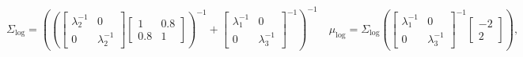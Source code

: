 \begin{equation}
  \Sigma_{\text{log}} = 
  \left(
    \left(
      \begin{bmatrix}
        \lambda_{2}^{-1} & 0 \\
        0 & \lambda_{2}^{-1}
      \end{bmatrix}
      \begin{bmatrix}
        1 & 0.8 \\
        0.8 & 1
      \end{bmatrix}
    \right)^{-1}
    + 
    \begin{bmatrix}
      \lambda_{1}^{-1} & 0 \\
      0 & \lambda_{3}^{-1}
    \end{bmatrix}^{-1}
  \right)^{-1}
  \quad
  \mu_{\text{log}} = 
  \Sigma_{\text{log}} 
  \left(
    \begin{bmatrix}
      \lambda_{1}^{-1} & 0 \\
      0 & \lambda_{3}^{-1}
    \end{bmatrix}^{-1}
    \begin{bmatrix}
    -2 \\
    2
    \end{bmatrix}
  \right),
  \label{eqn:log-pooling-gaussian}
\end{equation}